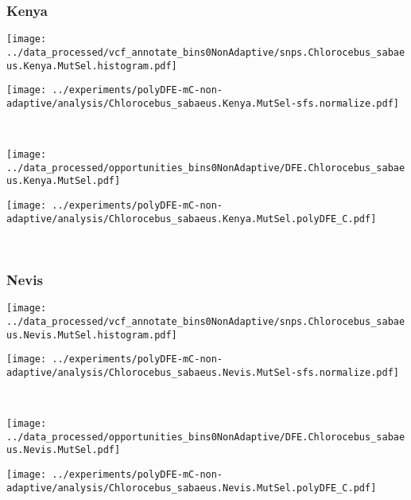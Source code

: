\subsubsection{Kenya}

\begin{minipage}{0.49\linewidth}
    \texttt{[image: ../data\_processed/vcf\_annotate\_bins0NonAdaptive/snps.Chlorocebus\_sabaeus.Kenya.MutSel.histogram.pdf]}
\end{minipage}
\begin{minipage}{0.49\linewidth}
    \texttt{[image: ../experiments/polyDFE-mC-non-adaptive/analysis/Chlorocebus\_sabaeus.Kenya.MutSel-sfs.normalize.pdf]}
\end{minipage}
\\
\begin{minipage}{0.49\linewidth}
    \texttt{[image: ../data\_processed/opportunities\_bins0NonAdaptive/DFE.Chlorocebus\_sabaeus.Kenya.MutSel.pdf]}
\end{minipage}
\begin{minipage}{0.49\linewidth}
    \texttt{[image: ../experiments/polyDFE-mC-non-adaptive/analysis/Chlorocebus\_sabaeus.Kenya.MutSel.polyDFE\_C.pdf]}
\end{minipage}
\\

\subsubsection{Nevis}

\begin{minipage}{0.49\linewidth}
    \texttt{[image: ../data\_processed/vcf\_annotate\_bins0NonAdaptive/snps.Chlorocebus\_sabaeus.Nevis.MutSel.histogram.pdf]}
\end{minipage}
\begin{minipage}{0.49\linewidth}
    \texttt{[image: ../experiments/polyDFE-mC-non-adaptive/analysis/Chlorocebus\_sabaeus.Nevis.MutSel-sfs.normalize.pdf]}
\end{minipage}
\\
\begin{minipage}{0.49\linewidth}
    \texttt{[image: ../data\_processed/opportunities\_bins0NonAdaptive/DFE.Chlorocebus\_sabaeus.Nevis.MutSel.pdf]}
\end{minipage}
\begin{minipage}{0.49\linewidth}
    \texttt{[image: ../experiments/polyDFE-mC-non-adaptive/analysis/Chlorocebus\_sabaeus.Nevis.MutSel.polyDFE\_C.pdf]}
\end{minipage}
\\

